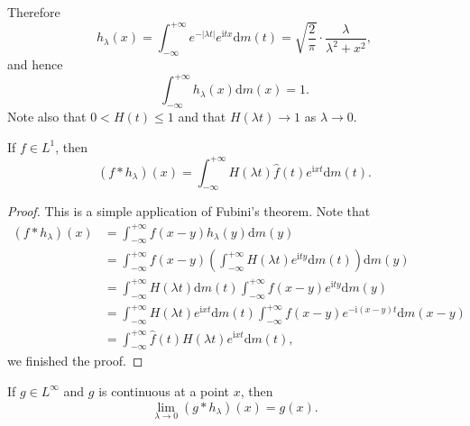 Therefore 
$$
h_{\lambda}\left( x \right) =\int_{-\infty}^{+\infty}{e^{-\left| \lambda t \right|}e^{\mathrm{i}tx}\mathrm{d}m\left( t \right)}=\sqrt{\frac{2}{\pi}}\cdot \frac{\lambda}{\lambda ^2+x^2},
$$
and hence 
$$
\int_{-\infty}^{+\infty}{h_{\lambda}\left( x \right) \mathrm{d}m\left( x \right)}=1.
$$
Note also that $0<H(t)\le 1$ and that $H(\lambda t)\to 1$ as $\lambda\to 0$.
\begin{proposition}
If $f\in L^1$, then 
$$
\left( f*h_{\lambda} \right) \left( x \right) =\int_{-\infty}^{+\infty}{H\left( \lambda t \right) \widehat{f}\left( t \right) e^{\mathrm{i}xt}\mathrm{d}m\left( t \right)}.
$$
\end{proposition}
\begin{proof}
This is a simple application of Fubini's theorem. Note that 
$$
\begin{aligned}
\left( f*h_{\lambda} \right) \left( x \right) &=\int_{-\infty}^{+\infty}{f\left( x-y \right) h_{\lambda}\left( y \right) \mathrm{d}m\left( y \right)}
\\
&=\int_{-\infty}^{+\infty}{f\left( x-y \right) \left( \int_{-\infty}^{+\infty}{H\left( \lambda t \right) e^{\mathrm{i}ty}\mathrm{d}m\left( t \right)} \right) \mathrm{d}m\left( y \right)}
\\
&=\int_{-\infty}^{+\infty}{H\left( \lambda t \right) \mathrm{d}m\left( t \right) \int_{-\infty}^{+\infty}{f\left( x-y \right) e^{\mathrm{i}ty}\mathrm{d}m\left( y \right)}}
\\
&=\int_{-\infty}^{+\infty}{H\left( \lambda t \right) e^{\mathrm{i}xt}\mathrm{d}m\left( t \right) \int_{-\infty}^{+\infty}{f\left( x-y \right) e^{-\mathrm{i}\left( x-y \right) t}\mathrm{d}m\left( x-y \right)}}
\\
&=\int_{-\infty}^{+\infty}{\widehat{f}\left( t \right) H\left( \lambda t \right) e^{\mathrm{i}xt}\mathrm{d}m\left( t \right)},
\end{aligned}
$$
we finished the proof.
\end{proof}
\begin{theorem}
If $g\in L^\infty$ and $g$ is continuous at a point $x$, then 
$$\lim_{\lambda\to 0}(g*h_\lambda)(x)=g(x).$$
\end{theorem}
